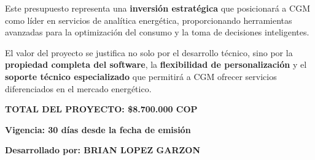 \documentclass[12pt,a4paper]{article}
\begin{document}
Este presupuesto representa una \textbf{inversión estratégica} que posicionará a CGM como líder en servicios de analítica energética, proporcionando herramientas avanzadas para la optimización del consumo y la toma de decisiones inteligentes.

El valor del proyecto se justifica no solo por el desarrollo técnico, sino por la \textbf{propiedad completa del software}, la \textbf{flexibilidad de personalización} y el \textbf{soporte técnico especializado} que permitirá a CGM ofrecer servicios diferenciados en el mercado energético.

\vspace{1.5cm}

\begin{center}
\Large\textbf{TOTAL DEL PROYECTO: \$8.700.000 COP}
\end{center}

\vspace{1cm}

\begin{center}
\textbf{Vigencia: 30 días desde la fecha de emisión}
\end{center}

\vspace{1cm}

\begin{center}
\textbf{Desarrollado por: BRIAN LOPEZ GARZON}
\end{center}
\end{document}
